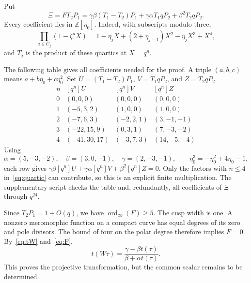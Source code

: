 \documentclass[11pt]{amsart}
\theoremstyle{remark}
\DeclareMathOperator{\ord}{ord}
\newcommand{\ZZ}{\mathbb Z}
\begin{document}
Put
\begin{equation}\label{eq:Xi}
 \Xi=FT_2P_1
 =\gamma\beta(T_1-T_2)P_1
  +\gamma\alpha T_1qP_2+\beta^2T_2qP_2.
\end{equation}
Every coefficient lies in $\ZZ[\eta_0]$. Indeed, with subscripts modulo three,
\begin{equation}\label{eq:quartic}
 \prod_{a\in C_j}(1-\zeta^a X)
 =1-\eta_jX+(2+\eta_{j-1})X^2-\eta_jX^3+X^4,
\end{equation}
and $T_j$ is the product of these quartics at $X=q^n$.

The following table gives all coefficients needed for the proof. A triple $(a,b,c)$ means $a+b\eta_0+c\eta_0^2$. Set
$U=(T_1-T_2)P_1$, $V=T_1qP_2$, and $Z=T_2qP_2$.
\begin{equation}\label{eq:coefficient-table}
\begin{array}{c|rrr}
 n &[q^n]U &[q^n]V &[q^n]Z\\\hline
 0&(0,0,0)&(0,0,0)&(0,0,0)\\
 1&(-5,3,2)&(1,0,0)&(1,0,0)\\
 2&(-7,6,3)&(-2,2,1)&(3,-1,-1)\\
 3&(-22,15,9)&(0,3,1)&(7,-3,-2)\\
 4&(-41,30,17)&(-3,7,3)&(14,-5,-4)
\end{array}
\end{equation}
Using
\[
 \alpha=(5,-3,-2),\quad\beta=(3,0,-1),\quad\gamma=(2,-3,-1),
 \qquad \eta_0^3=-\eta_0^2+4\eta_0-1,
\]
each row gives
$\gamma\beta[q^n]U+\gamma\alpha[q^n]V+\beta^2[q^n]Z=0$.
Only the factors with $n\le4$ in~\eqref{eq:quartic} can contribute, so this is an explicit finite multiplication. The supplementary script checks the table and, redundantly, all coefficients of $\Xi$ through $q^{24}$.

Since $T_2P_1=1+O(q)$, we have $\ord_\infty(F)\ge5$. The cusp width is one. A nonzero meromorphic function on a compact curve has equal degrees of its zero and pole divisors. The bound of four on the polar degree therefore implies $F=0$. By~\eqref{eq:tW} and~\eqref{eq:F},
\begin{equation}\label{eq:projective}
 t(W\tau)=\frac{\gamma-\beta t(\tau)}{\beta+\alpha t(\tau)}.
\end{equation}
This proves the projective transformation, but the common scalar remains to be determined.
\end{document}
